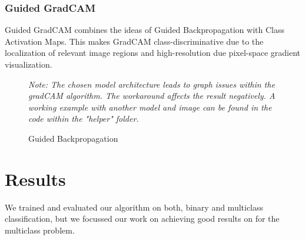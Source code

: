 \documentclass{article}
\begin{document}
\subsubsection{Guided GradCAM}
Guided GradCAM combines the ideas of Guided Backpropagation with Class Activation Maps.
This makes GradCAM class-discriminative due to the localization of relevant image regions and high-resolution due pixel-space gradient visualization.
\begin{figure}[h]
  \centering
  \hspace{0.5cm}
  \hspace{0.5cm}
  \caption{Guided Backpropagation}
  \small \textit{{Note: The chosen model architecture leads to graph issues within the gradCAM algorithm. The workaround affects the result negatively.
  A working example with another model and image can be found in the code within the "helper" folder.}}
\end{figure}

\section{Results}
We trained and evaluated our algorithm on both, binary and multiclass classification, but we focussed our work on achieving
good results on for the multiclass problem.
\end{document}
